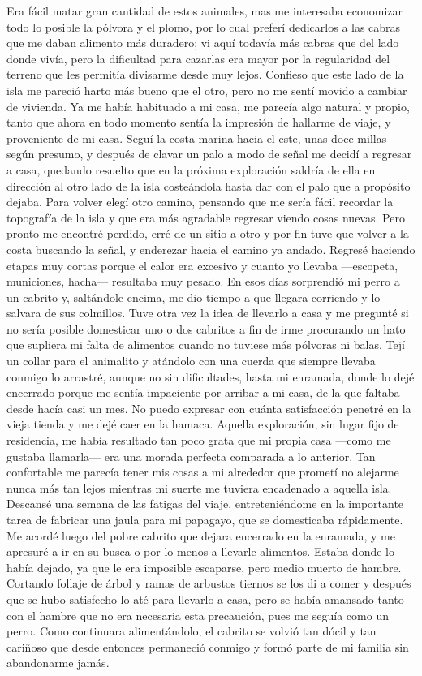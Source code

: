 \documentclass{novela}
\begin{document}
    Era fácil matar gran cantidad de estos animales, mas me interesaba economizar todo lo posible la pólvora y el plomo, por lo cual preferí dedicarlos a las cabras que me daban alimento más duradero; vi aquí todavía más cabras que del lado donde vivía, pero la dificultad para cazarlas era mayor por la regularidad del terreno que les permitía divisarme desde muy lejos.
    Confieso que este lado de la isla me pareció harto más bueno que el otro, pero no me sentí movido a cambiar de vivienda. Ya me había habituado a mi casa, me parecía algo natural y propio, tanto que ahora en todo momento sentía la impresión de hallarme de viaje, y proveniente de mi casa. Seguí la costa marina hacia el este, unas doce millas según presumo, y después de clavar un palo a modo de señal me decidí a regresar a casa, quedando resuelto que en la próxima exploración saldría de ella en dirección al otro lado de la isla costeándola hasta dar con el palo que a propósito dejaba.
    Para volver elegí otro camino, pensando que me sería fácil recordar la topografía de la isla y que era más agradable regresar viendo cosas nuevas. Pero pronto me encontré perdido, erré de un sitio a otro y por fin tuve que volver a la costa buscando la señal, y enderezar hacia el camino ya andado. Regresé haciendo etapas muy cortas porque el calor era excesivo y cuanto yo llevaba —escopeta, municiones, hacha— resultaba muy pesado.
    En esos días sorprendió mi perro a un cabrito y, saltándole encima, me dio tiempo a que llegara corriendo y lo salvara de sus colmillos. Tuve otra vez la idea de llevarlo a casa y me pregunté si no sería posible domesticar uno o dos cabritos a fin de irme procurando un hato que supliera mi falta de alimentos cuando no tuviese más pólvoras ni balas.
    Tejí un collar para el animalito y atándolo con una cuerda que siempre llevaba conmigo lo arrastré, aunque no sin dificultades, hasta mi enramada, donde lo dejé encerrado porque me sentía impaciente por arribar a mi casa, de la que faltaba desde hacía casi un mes.
    No puedo expresar con cuánta satisfacción penetré en la vieja tienda y me dejé caer en la hamaca. Aquella exploración, sin lugar fijo de residencia, me había resultado tan poco grata que mi propia casa —como me gustaba llamarla— era una morada perfecta comparada a lo anterior. Tan confortable me parecía tener mis cosas a mi alrededor que prometí no alejarme nunca más tan lejos mientras mi suerte me tuviera encadenado a aquella isla.
    Descansé una semana de las fatigas del viaje, entreteniéndome en la importante tarea de fabricar una jaula para mi papagayo, que se domesticaba rápidamente. Me acordé luego del pobre cabrito que dejara encerrado en la enramada, y me apresuré a ir en su busca o por lo menos a llevarle alimentos. Estaba donde lo había dejado, ya que le era imposible escaparse, pero medio muerto de hambre. Cortando follaje de árbol y ramas de arbustos tiernos se los di a comer y después que se hubo satisfecho lo até para llevarlo a casa, pero se había amansado tanto con el hambre que no era necesaria esta precaución, pues me seguía como un perro. Como continuara alimentándolo, el cabrito se volvió tan dócil y tan cariñoso que desde entonces permaneció conmigo y formó parte de mi familia sin abandonarme jamás.
\end{document}
